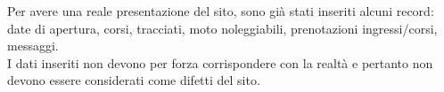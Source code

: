 Per avere una reale presentazione del sito, sono già stati inseriti alcuni record: date di apertura, corsi, tracciati, moto noleggiabili, prenotazioni ingressi/corsi, messaggi.\\
I dati inseriti non devono per forza corrispondere con la realtà e pertanto non devono essere considerati come difetti del sito.
